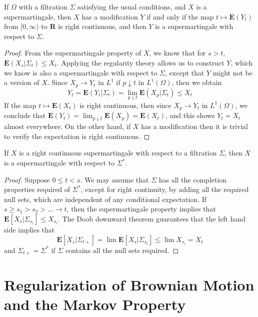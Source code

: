 \begin{theorem}
    If $\Omega$ with a filtration $\Sigma$ satisfying the usual conditions, and $X$ is a supermartingale, then $X$ has a \cadlag modification $Y$ if and only if the map $t \mapsto \mathbf{E}(Y_t)$ from $[0,\infty)$ to $\mathbf{R}$ is right continuous, and then $Y$ is a \cadlag supermartingale with respect to $\Sigma$.
\end{theorem}
\begin{proof}
    From the supermartingale property of $X$, we know that for $s > t$, $\mathbf{E}(X_s|\Sigma_t) \leq X_t$. Applying the regularity theory allows us to construct $Y$, which we know is also a supermartingale with respect to $\Sigma$, except that $Y$ might not be a version of $X$. Since $X_p \to Y_t$ in $L^1$ if $p \downarrow t$ in $L^1(\Omega)$, then we obtain
    \[ Y_t = \mathbf{E}(Y_t|\Sigma_t) = \lim_{p \downarrow t} \mathbf{E}(X_p|\Sigma_t) \leq X_t \]
    If the map $t \mapsto \mathbf{E}(X_t)$ is right continuous, then since $X_p \to Y_t$ in $L^1(\Omega)$, we conclude that $\mathbf{E}(Y_t) = \lim_{p \downarrow t} \mathbf{E}(X_p) = \mathbf{E}(X_t)$, and this shows $Y_t = X_t$ almost everywhere. On the other hand, if $X$ has a \cadlag modification then it is trivial to verify the expectation is right continuous.
\end{proof}

\begin{lemma}
    If $X$ is a right continuous supermartingale with respect to a filtration $\Sigma$, then $X$ is a supermartingale with respect to $\Sigma^*$.
\end{lemma}
\begin{proof}
    Suppose $0 \leq t < s$. We may assume that $\Sigma$ has all the completion properties required of $\Sigma^*$, except for right continuity, by adding all the required null sets, which are independent of any conditional expectation. If $s \geq s_1 > s_2 > \dots \to t$, then the supermartingale property implies that $\mathbf{E}[X_s|\Sigma_{s_i}] \leq X_{s_i}$. The Doob downward theorem guarantees that the left hand side implies that
    \[ \mathbf{E}[X_s|\Sigma_{t+}] = \lim \mathbf{E}[X_s|\Sigma_{s_i}] \leq \lim X_{s_i} = X_t \]
    and $\Sigma_{t+} = \Sigma^*$ if $\Sigma$ contains all the null sets required.
\end{proof}

\section{Regularization of Brownian Motion and the Markov Property}

